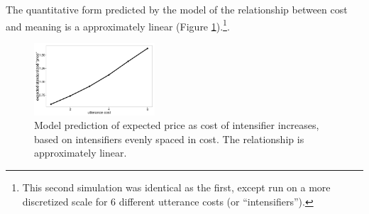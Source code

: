 \documentclass[10pt,letterpaper]{article}
\begin{document}
The quantitative form predicted by the model of the relationship between cost and meaning is a approximately linear (Figure \ref{model-heights}).\footnote{This second simulation was identical as the first, except run on a more discretized scale for 6 different utterance costs (or ``intensifiers'').}.

\begin{figure}[ht]
\begin{center}\includegraphics[width=0.4\textwidth]{height-by-cost.png}
\end{center}
\caption{Model prediction of expected price as cost of intensifier increases, based on intensifiers evenly spaced in cost. The relationship is approximately linear.} 
\label{model-heights}
\end{figure}




\setlength{\bibleftmargin}{.125in}
\setlength{\bibindent}{-\bibleftmargin}


 
\end{document}
